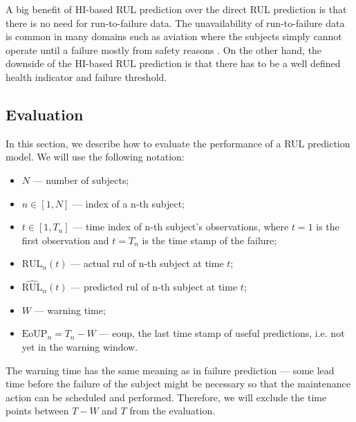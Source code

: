 
A big benefit of HI-based RUL prediction over the direct RUL prediction is that there is no need for run-to-failure data.
The unavailability of run-to-failure data is common in many domains such as aviation where the subjects simply cannot operate until a failure mostly from safety reasons \cite{saxena2010metrics}.
On the other hand, the downside of the HI-based RUL prediction is that there has to be a well defined health indicator and failure threshold.

\subsection{Evaluation}
\label{sec:approaches_rul_evaluation}

In this section, we describe how to evaluate the performance of a RUL prediction model.
We will use the following notation:
\begin{itemize}
    \item $N$ --- number of subjects;
    \item $n \in [1, N]$ --- index of a n-th subject;
    \item $t \in [1, T_n]$ --- time index of n-th subject's observations, where $t=1$ is the first observation and $t=T_n$ is the time stamp of the failure;
    \item $\text{RUL}_n(t)$ --- actual \gls{rul} of n-th subject at time $t$;
    \item $\widehat{\text{RUL}}_n(t)$ --- predicted \gls{rul} of n-th subject at time $t$;
    \item $W$ --- warning time;
    \item $\text{EoUP}_n = T_n-W$ --- \acrfull{eoup}, the last time stamp of useful predictions, i.e. not yet in the warning window.
\end{itemize}
The warning time has the same meaning as in failure prediction --- some lead time before the failure of the subject might be necessary so that the maintenance action can be scheduled and performed.
Therefore, we will exclude the time points between $T-W$ and $T$ from the evaluation.

    
    
